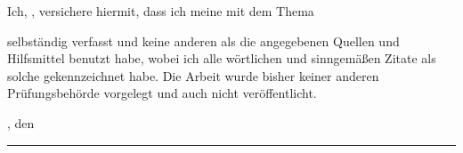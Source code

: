 \clearpage
{}
Ich, \authorName, versichere hiermit, dass ich meine \textbf{\projectTitleShort} mit dem
Thema
\begin{quote}
	\textit{\projectTitleLong}
\end{quote}
selbständig verfasst und keine anderen als die angegebenen Quellen und Hilfsmittel benutzt habe,
wobei ich alle wörtlichen und sinngemäßen Zitate als solche gekennzeichnet habe. Die Arbeit
wurde bisher keiner anderen Prüfungsbehörde vorgelegt und auch nicht veröffentlicht.\par\bigskip

\deliveryPlace, den \submissionDate\par
\rule[-0.1cm]{5.5cm}{0.5pt}\par
\authorName
